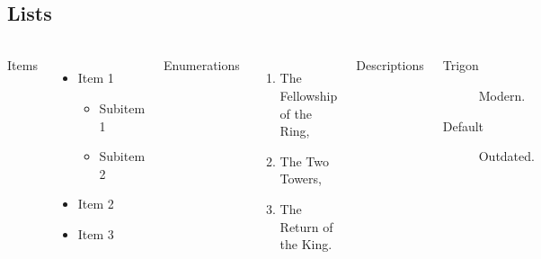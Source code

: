\subsection{Lists}
\begin{frame}{\insertsectionhead}
  \framesubtitle{\insertsubsectionhead}
  \begin{columns}[T,onlytextwidth]
    Items
    \begin{itemize}
      \item Item 1
        \begin{itemize}
          \item Subitem 1
          \item Subitem 2
        \end{itemize}
      \item Item 2
      \item Item 3
    \end{itemize}

    Enumerations
    \begin{enumerate}
      \item The Fellowship of the Ring,
      \item The Two Towers,
      \item The Return of the King.
    \end{enumerate}

    Descriptions
    \begin{description}
      \item[Trigon] Modern. \item[Default] Outdated.
    \end{description}
  \end{columns}
\end{frame}

